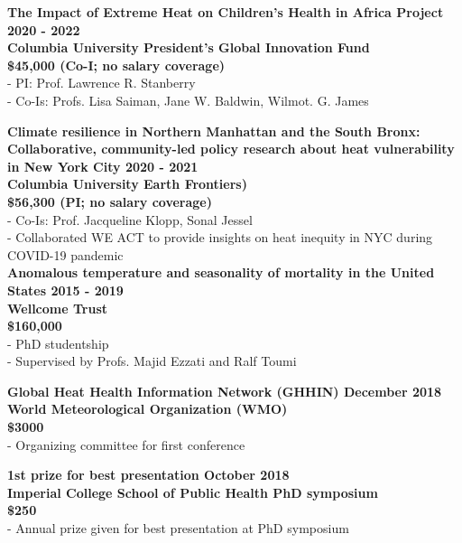 \noindent \textbf{The Impact of Extreme Heat on Children’s Health in Africa Project \hfill 2020 - 2022\\ 
Columbia University President’s Global Innovation Fund \\
\$45,000 (Co-I; no salary coverage)} \\
- PI: Prof. Lawrence R. Stanberry \\
- Co-Is: Profs. Lisa Saiman, Jane W. Baldwin, Wilmot. G. James \medskip

\noindent \textbf{Climate resilience in Northern Manhattan and the South Bronx: Collaborative, community-led policy research about heat vulnerability in New York City \hfill 2020 - 2021 \\
Columbia University Earth Frontiers) \\ 
\$56,300 (PI; no salary coverage)} \\
- Co-Is: Prof. Jacqueline Klopp, Sonal Jessel\\
- Collaborated WE ACT to provide insights on heat inequity in NYC during COVID-19 pandemic \\

\noindent \textbf{Anomalous temperature and seasonality of mortality in the United States \hfill 2015 - 2019 \\ 
Wellcome Trust \\
\$160,000 }\\
- PhD studentship\\
- Supervised by Profs. Majid Ezzati and Ralf Toumi \medskip

\noindent \textbf{Global Heat Health Information Network (GHHIN) \hfill December 2018\\ 
World Meteorological Organization (WMO)\\
\$3000 }\\
- Organizing committee for first conference \medskip

\noindent \textbf{1st prize for best presentation \hfill October 2018 \\
Imperial College School of Public Health PhD symposium \\
\$250 }\\
- Annual prize given for best presentation at PhD symposium \medskip

